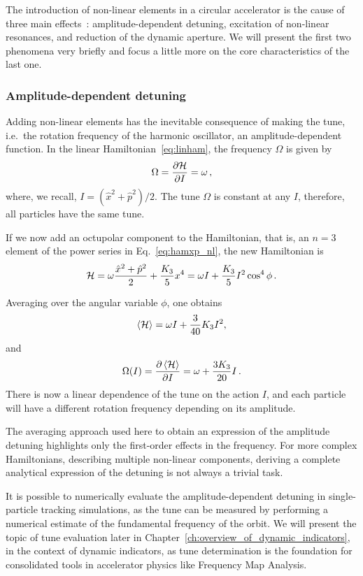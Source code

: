 The introduction of non-linear elements in a circular accelerator is the cause of three main effects~\cite{herr}: amplitude-dependent detuning, excitation of non-linear resonances, and reduction of the dynamic aperture. We will present the first two phenomena very briefly and focus a little more on the core characteristics of the last one.

\subsubsection{Amplitude-dependent detuning}

Adding non-linear elements has the inevitable consequence of making the tune, i.e.\ the rotation frequency of the harmonic oscillator, an amplitude-dependent function. In the linear Hamiltonian~\eqref{eq:linham}, the frequency $\Omega$ is given by
\begin{equation}
	\Omega = \pdv{\mathcal{H}}{I} = \omega\,,
\end{equation}
where, we recall, $I=(\hat x^2 + \hat p^2)/2$. The tune $\Omega$ is constant at any $I$, therefore, all particles have the same tune.

If we now add an octupolar component to the Hamiltonian, that is, an $n=3$ element of the power series in Eq.~\ref{eq:hamxp_nl}, the new Hamiltonian is
\begin{equation}
	\mathcal{H} = \omega \frac{\hat x^2 + \hat p^2}{2} + \frac{K_3}{5} x^4 = \omega I + \frac{K_3}{5} I^2 \cos^4\phi\, .
\end{equation}

Averaging over the angular variable $\phi$, one obtains
\begin{equation}
	\left<{\mathcal{H}}\right> = \omega I + \frac{3}{40}K_3 I^2,
\end{equation}
%
and
%
\begin{equation}
	\Omega(I) = \pdv{\left<{\mathcal{H}}\right>}{I} = \omega + \frac{3K_3}{20} I\,.
\end{equation}
There is now a linear dependence of the tune on the action $I$, and each particle will have a different rotation frequency depending on its amplitude.

The averaging approach used here to obtain an expression of the amplitude detuning highlights only the first-order effects in the frequency. For more complex Hamiltonians, describing multiple non-linear components, deriving a complete analytical expression of the detuning is not always a trivial task.

It is possible to numerically evaluate the amplitude-dependent detuning in single-particle tracking simulations, as the tune can be measured by performing a numerical estimate of the fundamental frequency of the orbit. We will present the topic of tune evaluation later in Chapter~\ref{ch:overview_of_dynamic_indicators}, in the context of dynamic indicators, as tune determination is the foundation for consolidated tools in accelerator physics like Frequency Map Analysis.

